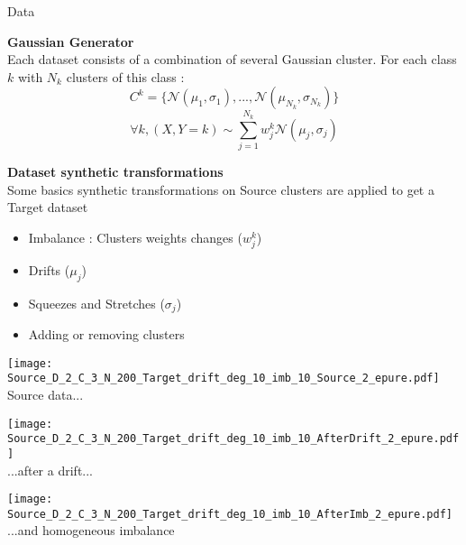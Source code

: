 \begin{frame}{Data}
    
\textbf{Gaussian Generator}\\
Each dataset consists of a combination of several Gaussian cluster.
For each class $k$ with $N_k$ clusters of this class :
$$ C^k = \{  \mathcal{N}(\mu_1,\sigma_1),..., \mathcal{N}(\mu_{N_k},\sigma_{N_k} )\}$$ 
$$  \forall k, (X,Y = k) \sim \sum_{j=1}^{N_k}  w_j^k \mathcal{N}(\mu_j,\sigma_j)$$

\begin{minipage}[t]{0.49\linewidth}
    \vspace{0pt}
    \textbf{Dataset synthetic transformations}\\
    Some basics synthetic transformations on Source clusters are applied to get a Target dataset
    \begin{itemize}
        \item Imbalance : Clusters weights changes ($ w_j^k$)
        \item Drifts  ($\mu_j$)
        \item Squeezes and Stretches ($\sigma_j$)
        \item Adding or removing clusters
    \end{itemize}
\end{minipage}\hfill
\begin{minipage}[t]{0.49\linewidth}
    \vspace{0pt}
    \renewcommand{\ratio}{0.32}
    \renewcommand{\ratiob}{0.85}
    \begin{minipage}[t]{\ratio\linewidth}\vspace{0pt}
        \centering
        \texttt{[image: Source\_D\_2\_C\_3\_N\_200\_Target\_drift\_deg\_10\_imb\_10\_Source\_2\_epure.pdf]}\\
        {\small Source data...}
    \end{minipage}
    \begin{minipage}[t]{\ratio\linewidth}\vspace{0cm}
        \centering
        \texttt{[image: Source\_D\_2\_C\_3\_N\_200\_Target\_drift\_deg\_10\_imb\_10\_AfterDrift\_2\_epure.pdf]}\\
        {\small ...after a drift...}
    \end{minipage}
    \begin{minipage}[t]{\ratio\linewidth}\vspace{0cm}
        \centering
        \texttt{[image: Source\_D\_2\_C\_3\_N\_200\_Target\_drift\_deg\_10\_imb\_10\_AfterImb\_2\_epure.pdf]}\\
        {\small ...and homogeneous imbalance}
    \end{minipage}
\end{minipage}

\end{frame}

